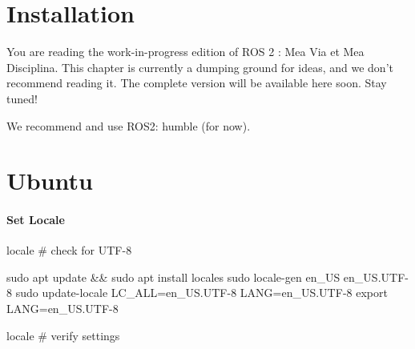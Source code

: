\documentclass[
  letterpaper,
  DIV=11,
  numbers=noendperiod]{scrreprt}
\newenvironment{Shaded}{\begin{snugshade}}{\end{snugshade}}
\newcommand{\BuiltInTok}[1]{\textcolor[rgb]{0.00,0.23,0.31}{#1}}
\newcommand{\CommentTok}[1]{\textcolor[rgb]{0.37,0.37,0.37}{#1}}
\newcommand{\ExtensionTok}[1]{\textcolor[rgb]{0.00,0.23,0.31}{#1}}
\newcommand{\FunctionTok}[1]{\textcolor[rgb]{0.28,0.35,0.67}{#1}}
\newcommand{\KeywordTok}[1]{\textcolor[rgb]{0.00,0.23,0.31}{#1}}
\newcommand{\NormalTok}[1]{\textcolor[rgb]{0.00,0.23,0.31}{#1}}
\newcommand{\OperatorTok}[1]{\textcolor[rgb]{0.37,0.37,0.37}{#1}}
\newcommand{\VariableTok}[1]{\textcolor[rgb]{0.07,0.07,0.07}{#1}}
\begin{document}

\hypertarget{installation}{%
\chapter{Installation}\label{installation}}

\begin{tcolorbox}[enhanced jigsaw, toprule=.15mm, left=2mm, bottomtitle=1mm, toptitle=1mm, colbacktitle=quarto-callout-important-color!10!white, arc=.35mm, bottomrule=.15mm, titlerule=0mm, opacitybacktitle=0.6, breakable, coltitle=black, title=\textcolor{quarto-callout-important-color}{\faExclamation}\hspace{0.5em}{Important}, rightrule=.15mm, colback=white, leftrule=.75mm, colframe=quarto-callout-important-color-frame, opacityback=0]

You are reading the work-in-progress edition of ROS 2 : Mea Via et Mea
Disciplina. This chapter is currently a dumping ground for ideas, and we
don't recommend reading it. The complete version will be available here
soon. Stay tuned!

\end{tcolorbox}

We recommend and use ROS2: humble (for now).


\hypertarget{sec-ubuntu}{%
\chapter{Ubuntu}\label{sec-ubuntu}}

\hypertarget{set-locale}{%
\subsubsection{Set Locale}\label{set-locale}}

\begin{Shaded}
\begin{Highlighting}[]

\ExtensionTok{locale}  \CommentTok{\# check for UTF{-}8}

\FunctionTok{sudo}\NormalTok{ apt update }\KeywordTok{\&\&} \FunctionTok{sudo}\NormalTok{ apt install locales}
\FunctionTok{sudo}\NormalTok{ locale{-}gen en\_US en\_US.UTF{-}8}
\FunctionTok{sudo}\NormalTok{ update{-}locale LC\_ALL=en\_US.UTF{-}8 LANG=en\_US.UTF{-}8}
\BuiltInTok{export} \VariableTok{LANG}\OperatorTok{=}\NormalTok{en\_US.UTF{-}8}

\ExtensionTok{locale}  \CommentTok{\# verify settings}
\end{Highlighting}
\end{Shaded}
\end{document}

